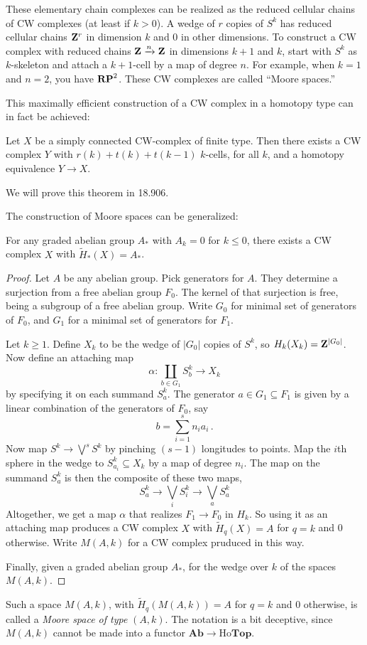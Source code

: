 These elementary chain complexes can be realized as the reduced cellular chains of CW complexes (at least if $k>0$). A wedge of $r$ copies of $S^k$ has reduced cellular chains $\mathbf Z^r$ in dimension $k$ and 0 in other dimensions.
To construct a CW complex with reduced chains $\mathbf Z\xrightarrow{n}\mathbf Z$ in dimensions $k+1$ and $k$, start with $S^k$ as $k$-skeleton and attach a $k+1$-cell
by a map of degree $n$.
For example, when $k=1$ and $n=2$, you have $\mathbf{RP}^2$. These CW complexes are
called ``Moore spaces.''

This maximally efficient construction of a CW complex in a homotopy type
can in fact be achieved:

\begin{theorem}[Wall]
Let $X$ be a simply connected CW-complex of finite type. Then there exists a CW complex $Y$ with $r(k)+t(k)+t(k-1)$ $k$-cells, for all $k$, and a homotopy equivalence $Y\to X$.
\end{theorem}

We will prove this theorem in 18.906.

The construction of Moore spaces can be generalized:
\begin{prop} For any graded abelian group $A_*$ with $A_k=0$ for $k\leq0$, 
there exists a CW complex $X$ with $\widetilde H_*(X)=A_*$.
\end{prop}
\begin{proof}
Let $A$ be any abelian group. Pick generators for $A$. 
They determine a surjection
from a free abelian group $F_0$. The kernel of that surjection is free,
being a subgroup of a free abelian group. Write $G_0$ for minimal set of
generators of $F_0$, and $G_1$ for a minimal set of generators for $F_1$.

Let $k\geq1$. Define $X_k$ to be the wedge of $|G_0|$ copies of $S^k$,
so $H_k(X_k)=\mathbf Z^{|G_0|}$. Now define an attaching map 
\[
\alpha:\coprod_{b\in G_1} S^k_b\to X_k
\]
by specifying it on each summand $S^k_a$. The generator 
$a\in G_1\subseteq F_1$ is given by a linear combination of the generators
of $F_0$, say 
\[
b=\sum_{i=1}^s n_ia_i\,.
\]
Now map $S^k\to\bigvee^s S^k$ by pinching $(s-1)$ longitudes to points. 
Map the $i$th sphere in the wedge to $S^k_{a_i}\subseteq X_k$ by a map of
degree $n_i$. The map on the summand $S^k_a$ is then the composite of these 
two maps,
\[
S^k_a\to\bigvee_i S^k_i\to\bigvee_a S^k_a
\]
Altogether, we get a map $\alpha$ that realizes $F_1\to F_0$ in $H_k$.
So using it as an attaching map produces a CW complex $X$ with 
$\widetilde H_q(X)=A$ for $q=k$ and 0 otherwise. Write $M(A,k)$ for 
a CW complex pruduced in this way.

Finally, given a graded abelian group $A_*$, for the wedge over $k$ of the
spaces $M(A,k)$. 
\end{proof}

Such a space $M(A,k)$, with $\widetilde H_q(M(A,k))=A$ for $q=k$ and 0 
otherwise, is called a {\em Moore space of type} $(A,k)$. 
The notation is a bit deceptive, since $M(A,k)$ cannot be made into a functor
$\mathbf{Ab}\to\mathrm{Ho}\mathbf{Top}$.


